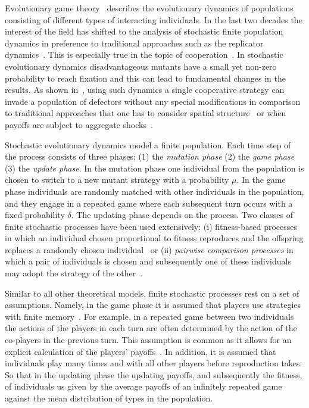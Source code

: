 \documentclass[11pt]{article}
\theoremstyle{plainCl1}
\theoremstyle{plainCl2}
\begin{document}
Evolutionary game theory~\cite{smith1982evolution, hofbauer1998evolutionary,
nowak:Nature:2004, hauert2005game} describes the evolutionary dynamics of
populations consisting of different types of interacting individuals. In the
last two decades the interest of the field has shifted to the analysis of
stochastic finite population dynamics in preference to traditional approaches
such as the replicator dynamics~\cite{hofbauer:JTB:1979, taylor:MATHBIO:1978}.
This is especially true in the topic of cooperation~\cite{hilbe:PNAS:2013,
hilbe:Nature:2018,glynatsi:SCR:2020}. In stochastic evolutionary dynamics
disadvantageous mutants have a small yet non-zero probability to reach fixation
and this can lead to fundamental changes in the results. As shown
in~\cite{nowak:Nature:2004}, using such dynamics a single cooperative strategy
can invade a population of defectors without any special modifications in
comparison to traditional approaches that one has to consider spatial
structure~\cite{nowak:Nature:1992} or when payoffs are subject to aggregate
shocks~\cite{fudenberg:JET:1992}.

Stochastic evolutionary dynamics model a finite population. Each
time step of the process consists of three phases; (1) the \textit{mutation
phase} (2) the \textit{game phase} (3) the \textit{update phase}. In the
mutation phase one individual from the population is chosen to switch to a new
mutant strategy with a probability \(\mu\). In the game phase individuals are
randomly matched with other individuals in the population, and they engage in a
repeated game where each subsequent turn occurs with a fixed probability
\(\delta\). The updating phase depends on the process. Two classes of
finite stochastic processes have been used extensively: (i) fitness-based
processes in which an individual chosen proportional to fitness reproduces and
the offspring replaces a randomly chosen individual~\cite{nowak:Nature:2004} or
(ii) \textit{pairwise comparison processes} in which a pair of individuals is
chosen and subsequently one of these individuals may adopt the strategy of the
other~\cite{traulsen2007pairwise}.

Similar to all other theoretical models, finite stochastic processes rest on a
set of assumptions. Namely, in the game phase it is assumed that players use
strategies with finite memory~\cite{Nowak1992tit, Baek2016}. For example, in a
repeated game between two individuals the actions of the players in each turn
are often determined by the action of the co-players in the previous turn. This
assumption is common as it allows for an explicit calculation of the players'
payoffs~\cite{sigmund2010calculus}. In addition, it is
assumed that individuals play many times and with all other players before
reproduction takes. So that in the updating phase the updating payoffs, and
subsequently the fitness, of individuals us given by the average payoffs of an
infinitely repeated game against the mean distribution of types in the
population.
\end{document}
